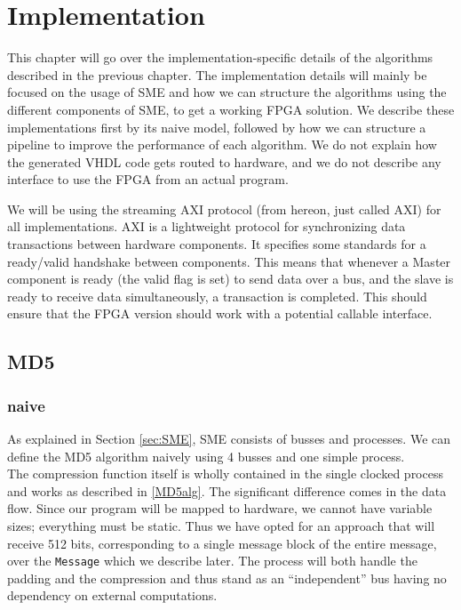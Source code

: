 \documentclass[a4paper, openany]{book}
\begin{document}
\chapter{Implementation}
\label{sec:orgb01bc4c}
This chapter will go over the implementation-specific details of the algorithms described in the previous chapter. The implementation details will mainly be focused on the usage of SME and how we can structure the algorithms using the different components of SME, to get a working FPGA solution. We describe these implementations first by its naive model, followed by how we can structure a pipeline to improve the performance of each algorithm. We do not explain how the generated VHDL code gets routed to hardware, and we do not describe any interface to use the FPGA from an actual program.

We will be using the streaming AXI protocol\cite{AMBAaxi} (from hereon, just called AXI) for all implementations. AXI is a lightweight protocol for synchronizing data transactions between hardware components. It specifies some standards for a ready/valid handshake between components. This means that whenever a Master component is ready (the valid flag is set) to send data over a bus, and the slave is ready to receive data simultaneously, a transaction is completed. This should ensure that the FPGA version should work with a potential callable interface.
\section{MD5}
\label{sec:orgf7a4e0a}
\subsection{naive}
\label{MD5naive}
As explained in Section \ref{sec:SME}, SME consists of busses and processes. We can define the MD5 algorithm naively using 4 busses and one simple process.\\

The compression function itself is wholly contained in the single clocked process and works as described in \ref{MD5alg}. The significant difference comes in the data flow. Since our program will be mapped to hardware, we cannot have variable sizes; everything must be static. Thus we have opted for an approach that will receive 512 bits, corresponding to a single message block of the entire message, over the \texttt{Message} which we describe later. The process will both handle the padding and the compression and thus stand as an ``independent'' bus having no dependency on external computations.
\end{document}
